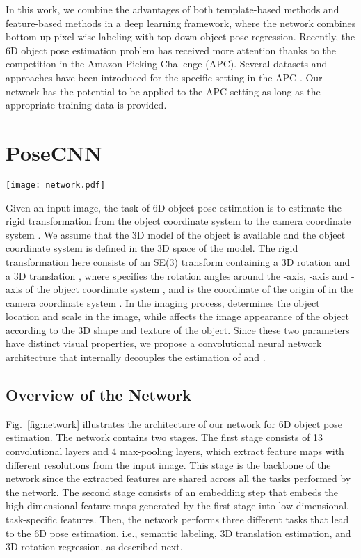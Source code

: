 \documentclass[conference]{IEEEtran}
\begin{document}
In this work, we combine the advantages of both template-based methods and feature-based methods in a deep learning framework, where the network combines bottom-up pixel-wise labeling with top-down object pose regression. Recently, the 6D object pose estimation problem has received more attention thanks to the competition in the Amazon Picking Challenge (APC). Several datasets and approaches have been introduced for the specific setting in the APC \cite{rennie2016dataset,zeng2017multi}. Our network has the potential to be applied to the APC setting as long as the appropriate training data is provided.

\section{PoseCNN}

\begin{figure*}
	\centering
	\texttt{[image: network.pdf]}
	\caption{Architecture of PoseCNN for 6D object pose estimation.}
	\label{fig:network}
	\vspace{-4mm}
\end{figure*}

Given an input image, the task of 6D object pose estimation is to estimate the rigid transformation from the object coordinate system  to the camera coordinate system . We assume that the 3D model of the object is available and the object coordinate system is defined in the 3D space of the model. The rigid transformation here consists of an SE(3) transform containing a 3D rotation  and a 3D translation , where  specifies the rotation angles around the -axis, -axis and -axis of the object coordinate system , and  is the coordinate of the origin of  in the camera coordinate system .
In the imaging process,  determines the object location and scale in the image, while  affects the image appearance of the object according to the 3D shape and texture of the object. Since these two parameters have distinct visual properties, we propose a convolutional neural network architecture that internally decouples the estimation of  and .

\subsection{Overview of the Network}

Fig.~\ref{fig:network} illustrates the architecture of our network for 6D object pose estimation. The network contains two stages. The first stage consists of 13 convolutional layers and 4 max-pooling layers, which extract feature maps with different resolutions from the input image. This stage is the backbone of the network since the extracted features are shared across all the tasks performed by the network. The second stage consists of an embedding step that embeds the high-dimensional feature maps generated by the first stage into low-dimensional,  task-specific features. Then, the network performs three different tasks that lead to the 6D pose estimation, i.e., semantic labeling, 3D translation estimation, and 3D rotation regression, as described next.
\end{document}
